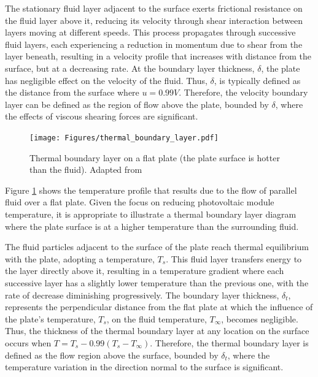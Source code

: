 The stationary fluid layer adjacent to the surface exerts frictional resistance on the fluid layer above it, reducing its velocity through shear interaction between layers moving at different speeds. This process propagates through successive fluid layers, each experiencing a reduction in momentum due to shear from the layer beneath, resulting in a velocity profile that increases with distance from the surface, but at a decreasing rate. At the boundary layer thickness, $\delta$, the plate has negligible effect on the velocity of the fluid. Thus, $\delta$, is typically defined as the distance from the surface where $u = 0.99V$. Therefore, the velocity boundary layer can be defined as the region of flow above the plate, bounded by $\delta$, where the effects of viscous shearing forces are significant. \cite{Cengel2014FundamentalsConvection}\vspace{0.5em}

\begin{figure}[ht]
    \centering
    \texttt{[image: Figures/thermal\_boundary\_layer.pdf]}
    \caption{Thermal boundary layer on a flat plate (the plate surface is hotter than the fluid). Adapted from \cite{Cengel2014FundamentalsConvection}}
    \label{fig:thermal_boundary_layer}
\end{figure}

Figure \ref{fig:thermal_boundary_layer} shows the temperature profile that results due to the flow of parallel fluid over a flat plate. Given the focus on reducing photovoltaic module temperature, it is appropriate to illustrate a thermal boundary layer diagram where the plate surface is at a higher temperature than the surrounding fluid.\vspace{0.5em}

The fluid particles adjacent to the surface of the plate reach thermal equilibrium with the plate, adopting a temperature, $T_s$. This fluid layer transfers energy to the layer directly above it, resulting in a temperature gradient where each successive layer has a slightly lower temperature than the previous one, with the rate of decrease diminishing progressively. The boundary layer thickness, $\delta_t$, represents the perpendicular distance from the flat plate at which the influence of the plate's temperature, $T_s$, on the fluid temperature, $T_\infty$, becomes negligible. Thus, the thickness of the thermal boundary layer at any location on the surface occurs when $T = T_s-0.99(T_s-T_\infty)$. Therefore, the thermal boundary layer is defined as the flow region above the surface, bounded by $\delta_t$, where the temperature variation in the direction normal to the surface is significant. \cite{Cengel2014FundamentalsConvection}\vspace{0.5em}

